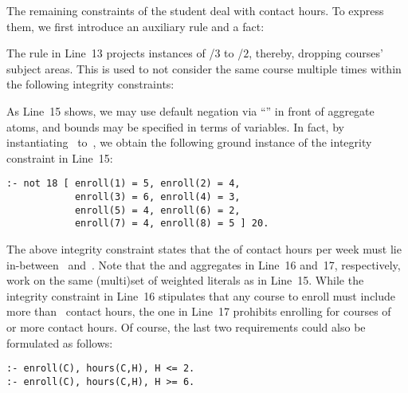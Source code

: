 \begin{example}
The remaining constraints of the student deal with contact hours.
To express them, we first introduce an auxiliary rule and a fact:
%

%
The rule in Line~13 projects instances of /$3$ to
/$2$, thereby, dropping courses' subject areas.
This is used to not consider the same course multiple times within the following
integrity constraints:
%

%
As Line~15 shows,
we may use default negation via ``'' in front of aggregate atoms,
and bounds may be specified in terms of variables.
In fact, by instantiating~ to~,
we obtain the following ground instance of the integrity constraint in Line~15:
%
\begin{lstlisting}[firstnumber=15,stepnumber=15]
:- not 18 [ enroll(1) = 5, enroll(2) = 4, 
            enroll(3) = 6, enroll(4) = 3,
            enroll(5) = 4, enroll(6) = 2,
            enroll(7) = 4, enroll(8) = 5 ] 20.
\end{lstlisting}
%
The above integrity constraint states that the  of contact hours per week
must lie in-between~ and~.
Note that the  and  aggregates in Line~16 and~17, respectively,
work on the same (multi)set of weighted literals as in Line~15.
While the integrity constraint in Line~16 stipulates that any course to enroll
must include more than~ contact hours,
the one in Line~17 prohibits enrolling for courses of~ or more contact hours.
Of course, the last two requirements could also be formulated as follows:
%
\begin{lstlisting}[firstnumber=16]
:- enroll(C), hours(C,H), H <= 2.
:- enroll(C), hours(C,H), H >= 6.
\end{lstlisting}


\end{example}
